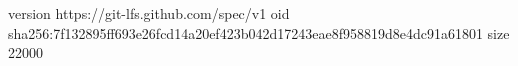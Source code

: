 version https://git-lfs.github.com/spec/v1
oid sha256:7f132895ff693e26fcd14a20ef423b042d17243eae8f958819d8e4dc91a61801
size 22000
